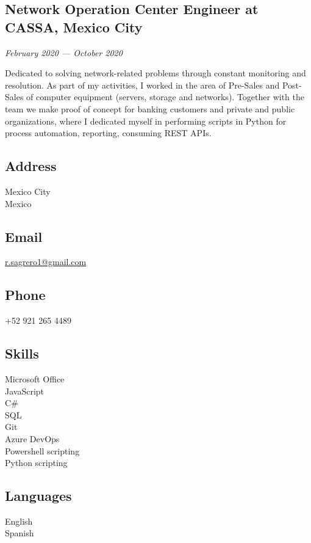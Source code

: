 \documentclass[11pt,a4paper]{article}
\begin{document}
\begin{minipage}[t]{0.65\textwidth}
\subsection*{Network Operation Center Engineer at CASSA, Mexico City}
\textit{February 2020 --- October 2020}

Dedicated to solving network-related problems through constant monitoring and resolution. As part of my activities, I worked in the area of Pre-Sales and Post-Sales of computer equipment (servers, storage and networks). Together with the team we make proof of concept for banking customers and private and public organizations, where I dedicated myself in performing scripts in Python for process automation, reporting, consuming REST APIs.

\end{minipage}
\hfill
\begin{minipage}[t]{0.3\textwidth}

\subsection*{\color{orange}Address}
Mexico City\\
Mexico

\subsection*{\color{orange}Email}
\href{mailto:r.sagrero1@gmail.com}{r.sagrero1@gmail.com}

\subsection*{\color{orange}Phone}
+52 921 265 4489

\vspace{0.3cm}

\subsection*{\color{orange}Skills}
Microsoft Office\\
JavaScript\\
C\#\\
SQL\\
Git\\
Azure DevOps\\
Powershell scripting\\
Python scripting

\vspace{0.3cm}

\subsection*{\color{orange}Languages}
English\\
Spanish

\end{minipage}
\end{document}
